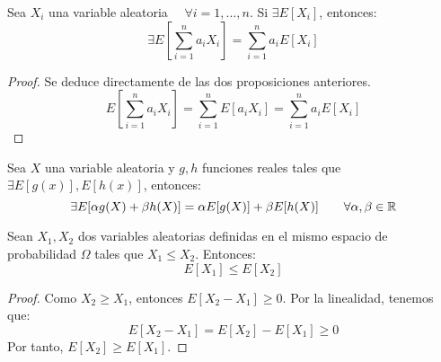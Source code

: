 \begin{coro}[Linealidad]
    Sea $X_i$ una variable aleatoria $\quad \forall i=1,\dots, n$. Si $\exists E[X_i]$, entonces:
    \begin{equation*}
        \exists E\left[\sum_{i=1}^n a_iX_i\right] = \sum_{i=1}^n a_iE[X_i]
    \end{equation*}
\end{coro}
\begin{proof}
    Se deduce directamente de las dos proposiciones anteriores.
    \begin{equation*}
        E\left[\sum_{i=1}^n a_iX_i\right] = \sum_{i=1}^n E[a_iX_i] = \sum_{i=1}^n a_iE[X_i]
    \end{equation*}
\end{proof}
\begin{coro}
    Sea $X$ una variable aleatoria y $g, h$ funciones reales tales que $\exists E[g(x)], E[h(x)]$, entonces:
    $$\exists E[\alpha g(X) + \beta h(X)] = \alpha E[g(X)] + \beta E[h(X)] \qquad \forall \alpha, \beta \in \mathbb R$$
\end{coro}

\begin{coro}
    Sean $X_1,X_2$ dos variables aleatorias definidas en el mismo espacio de probabilidad $\Omega$ tales que $X_1\leq X_2$.
    Entonces:
    \begin{equation*}
        E[X_1]\leq E[X_2]
    \end{equation*}
\end{coro}
\begin{proof}
    Como $X_2\geq X_1$, entonces $E[X_2-X_1]\geq 0$. Por la linealidad, tenemos que:
    \begin{equation*}
        E[X_2-X_1] = E[X_2]-E[X_1]\geq 0
    \end{equation*}
    Por tanto, $E[X_2]\geq E[X_1]$.
\end{proof}


